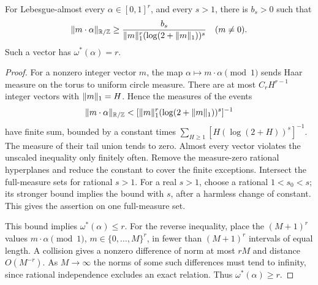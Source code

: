 \begin{lemma}\label{lem:metric-separation}
For Lebesgue-almost every $\alpha\in[0,1]^r$, and every $s>1$, there is $b_s>0$ such that
\begin{equation}\label{eq:log-separation}
 \lVert m\cdot\alpha\rVert_{\mathbb R/\mathbb Z}\ge
       \frac{b_s}{\lVert m\rVert_1^r(\log(2+\lVert m\rVert_1))^s}
                     \quad(m\ne0).
\end{equation}
Such a vector has $\omega^*(\alpha)=r$.
\end{lemma}
\begin{proof}
For a nonzero integer vector $m$, the map $\alpha\mapsto m\cdot\alpha\pmod1$ sends Haar measure on the torus to uniform circle measure. There are at most $C_rH^{r-1}$ integer vectors with $\lVert m\rVert_1=H$. Hence the measures of the events
\[
 \lVert m\cdot\alpha\rVert_{\mathbb R/\mathbb Z}<[\lVert m\rVert_1^r(\log(2+\lVert m\rVert_1))^s]^{-1}
\]
have finite sum, bounded by a constant times
$\sum_{H\ge1}[H(\log(2+H))^s]^{-1}$.
The measure of their tail union tends to zero. Almost every vector violates the unscaled inequality only finitely often. Remove the measure-zero rational hyperplanes and reduce the constant to cover the finite exceptions. Intersect the full-measure sets for rational $s>1$. For a real $s>1$, choose a rational $1<s_0<s$; its stronger bound implies the bound with $s$, after a harmless change of constant. This gives the assertion on one full-measure set.

This bound implies $\omega^*(\alpha)\le r$. For the reverse inequality, place the $(M+1)^r$ values $m\cdot\alpha\pmod1$, $m\in\{0,\ldots,M\}^r$, in fewer than $(M+1)^r$ intervals of equal length. A collision gives a nonzero difference of norm at most $rM$ and distance $O(M^{-r})$. As $M\to\infty$ the norms of some such differences must tend to infinity, since rational independence excludes an exact relation. Thus $\omega^*(\alpha)\ge r$.
\end{proof}

